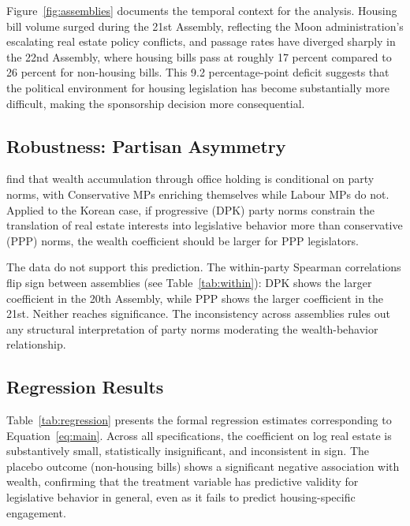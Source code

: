 \documentclass[11pt]{article}
\begin{document}
Figure~\ref{fig:assemblies} documents the temporal context for the analysis. Housing bill volume surged during the 21st Assembly, reflecting the Moon administration's escalating real estate policy conflicts, and passage rates have diverged sharply in the 22nd Assembly, where housing bills pass at roughly 17 percent compared to 26 percent for non-housing bills. This 9.2 percentage-point deficit suggests that the political environment for housing legislation has become substantially more difficult, making the sponsorship decision more consequential.

\subsection{Robustness: Partisan Asymmetry}

\citet{eggers2009} find that wealth accumulation through office holding is conditional on party norms, with Conservative MPs enriching themselves while Labour MPs do not. Applied to the Korean case, if progressive (DPK) party norms constrain the translation of real estate interests into legislative behavior more than conservative (PPP) norms, the wealth coefficient should be larger for PPP legislators.

The data do not support this prediction. The within-party Spearman correlations flip sign between assemblies (see Table~\ref{tab:within}): DPK shows the larger coefficient in the 20th Assembly, while PPP shows the larger coefficient in the 21st. Neither reaches significance. The inconsistency across assemblies rules out any structural interpretation of party norms moderating the wealth-behavior relationship.

\subsection{Regression Results}

Table~\ref{tab:regression} presents the formal regression estimates corresponding to Equation~\ref{eq:main}. Across all specifications, the coefficient on log real estate is substantively small, statistically insignificant, and inconsistent in sign. The placebo outcome (non-housing bills) shows a significant negative association with wealth, confirming that the treatment variable has predictive validity for legislative behavior in general, even as it fails to predict housing-specific engagement.
\end{document}
